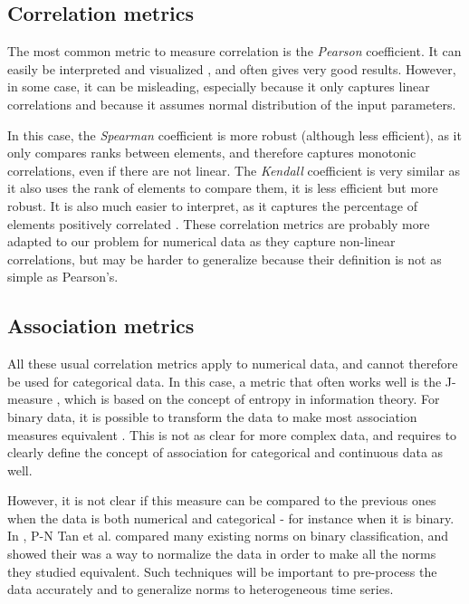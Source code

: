 \documentclass[12pt,a4paper]{article}
\begin{document}
\subsection{Correlation metrics}
The most common metric to measure correlation is the \emph{Pearson} coefficient. It can easily be interpreted and visualized \cite{pearson}, and often gives very good results. However, in some case, it can be misleading, especially because it only captures linear correlations and because it assumes normal distribution of the input parameters.

In this case, the \emph{Spearman} coefficient is more robust (although less efficient), as it only compares ranks between elements, and therefore captures monotonic correlations, even if there are not linear. The \emph{Kendall} coefficient is very similar as it also uses the rank of elements to compare them, it is less efficient but more robust. It is also much easier to interpret, as it captures the percentage of elements positively correlated \cite{spearman-kendall, spearman-kendall2}. These correlation metrics are probably more adapted to our problem for numerical data as they capture non-linear correlations, but may be harder to generalize because their definition is not as simple as Pearson's.

\subsection{Association metrics}

All these usual correlation metrics apply to numerical data, and cannot therefore be used for categorical data. In this case, a metric that often works well is the J-measure \cite{j-measure-rule, j-measure}, which is based on the concept of entropy in information theory. For binary data, it is possible to transform the data to make most association measures equivalent \cite{metric-comparison}. This is not as clear for more complex data, and requires to clearly define the concept of association for categorical and continuous data as well.

However, it is not clear if this measure can be compared to the previous ones when the data is both numerical and categorical - for instance when it is binary. In \cite{metric-comparison}, P-N Tan et al. compared many existing norms on binary classification, and showed their was a way to normalize the data in order to make all the norms they studied equivalent. Such techniques will be important to pre-process the data accurately and to generalize norms to heterogeneous time series.
\end{document}
